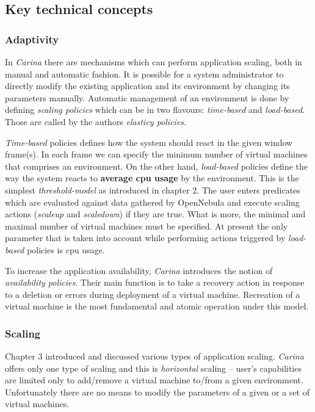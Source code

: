 \subsection{Key technical concepts}

\subsubsection{Adaptivity}
In \emph{Carina} there are mechanisms which can perform application scaling, both in manual and automatic fashion. It is possible for a system administrator to directly modify the existing application and its environment by changing its parameters manually. Automatic management of an environment is done by defining \emph{scaling policies} which can be in two flavours: \emph{time-based} and \emph{load-based}. Those are called by the authors \emph{elasticy policies}.

\emph{Time-based} policies defines how the system should react in the given window frame(s). In each frame we can specify the minimum number of virtual machines that comprises an environment. On the other hand, \emph{load-based} policies define the way the system reacts to \textbf{average cpu usage} by the environment. This is the simplest \emph{threshold-model} as introduced in chapter 2. The user enters predicates which are evaluated against data gathered by OpenNebula and execute scaling actions  (\emph{scaleup} and \emph{scaledown}) if they are true. What is more, the minimal and maximal number of virtual machines must be specified. At present the only parameter that is taken into account while performing actions triggered by \emph{load-based} policies is cpu usage.

To increase the application availability, \emph{Carina} introduces the notion of \emph{availability policies}. Their main function is to take a recovery action in response to a deletion or errors during deployment of a virtual machine. Recreation of a virtual machine is the most fundamental and atomic operation under this model.

\subsubsection{Scaling}
Chapter 3 introduced and discussed various types of application scaling. \emph{Carina} offers only one type of scaling and this is \emph{horizontal} scaling -- user's capabilities are limited only to add/remove a virtual machine to/from a given environment. Unfortunately there are no means to modify the parameters of a given or a set of virtual machines.

